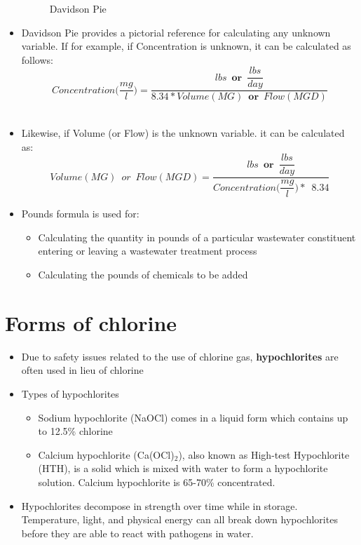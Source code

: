 \begin{itemize}
\begin{figure}[h]
\caption{Davidson Pie}
\end{figure}
\vspace{0.2cm}
\item Davidson Pie provides a pictorial reference for calculating any unknown variable.  If for example, if Concentration is unknown, it can be calculated as follows: \\$$Concentration\Big(\dfrac{mg}{l}\Big)=\dfrac{lbs \enspace \textbf{or} \enspace \dfrac{lbs}{day}}{8.34*Volume(MG) \enspace \textbf{or} \enspace Flow (MGD)}$$\\
\vspace{0.2cm}
\item Likewise, if Volume (or Flow) is the unknown variable. it can be calculated as:  \\$$Volume (MG) \enspace or \enspace Flow(MGD)=\dfrac{lbs \enspace \textbf{or} \enspace \dfrac{lbs}{day}}{Concentration\Big(\dfrac{mg}{l}\Big)* \enspace 8.34  }$$
\vspace{0.2cm}
\item Pounds formula is used for:
\begin{itemize}
\item Calculating the quantity in pounds of a particular wastewater constituent entering or leaving a wastewater treatment process
\item Calculating the pounds of chemicals to be added\\
\end{itemize}
\end{itemize}
\section*{Forms of chlorine}

\begin{itemize}
	\item Due to safety issues related to the use of chlorine gas, \textbf{hypochlorites} are often used in lieu of chlorine
	\item Types of hypochlorites
	\begin{itemize}
	\item Sodium hypochlorite (NaOCl) comes in a liquid form which contains up to 12.5\% chlorine
	\item Calcium hypochlorite (Ca(OCl)$_2$), also known as High-test Hypochlorite (HTH), is a solid which is mixed with water to form a hypochlorite solution. Calcium hypochlorite is 65-70\% concentrated.
	\end{itemize}
	\item Hypochlorites decompose in strength over time while in storage. Temperature, light, and physical energy can all break down hypochlorites before they are able to react with pathogens in water. 

\end{itemize} 
